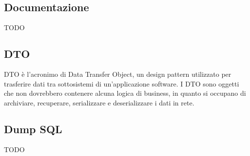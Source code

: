 \vspace{2em}
\subsection*{Documentazione}
TODO

\vspace{2em}
\subsection*{DTO}
DTO è l'acronimo di Data Transfer Object, un design pattern utilizzato per trasferire dati tra sottosistemi di un'applicazione software. I DTO sono oggetti che non dovrebbero contenere alcuna logica di business, in quanto si occupano di archiviare, recuperare, serializzare e deserializzare i dati in rete.

\vspace{2em}
\subsection*{Dump SQL}
TODO
